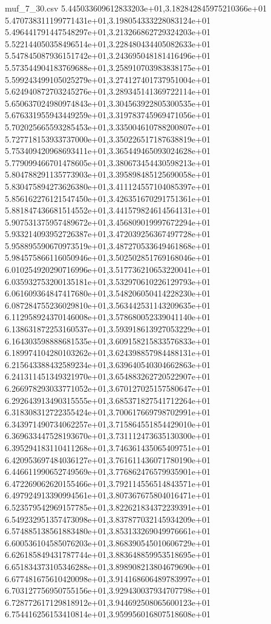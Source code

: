 \begin{filecontents*}{muf_7_30.csv}
5.445033609612833203e+01,3.182842845975210366e+01
5.470738311199771431e+01,3.198054333228083124e+01
5.496441791447548297e+01,3.213266862729324203e+01
5.522144050358496514e+01,3.228480434405082633e+01
5.547845087936151742e+01,3.243695048181416496e+01
5.573544904183769688e+01,3.258910703983838175e+01
5.599243499105025279e+01,3.274127401737951004e+01
5.624940872703245276e+01,3.289345141369722114e+01
5.650637024980974843e+01,3.304563922805300535e+01
5.676331955943449259e+01,3.319783745969471056e+01
5.702025665593285453e+01,3.335004610788200807e+01
5.727718153933737000e+01,3.350226517187638819e+01
5.753409420968693411e+01,3.365449465093024628e+01
5.779099466701478605e+01,3.380673454430598213e+01
5.804788291135773903e+01,3.395898485125690058e+01
5.830475894273626380e+01,3.411124557104085397e+01
5.856162276121547450e+01,3.426351670291751361e+01
5.881847436681514552e+01,3.441579824614564131e+01
5.907531375957489672e+01,3.456809019997672294e+01
5.933214093952726387e+01,3.472039256367497728e+01
5.958895590670973519e+01,3.487270533649461868e+01
5.984575866116050946e+01,3.502502851769168046e+01
6.010254920290716996e+01,3.517736210653220041e+01
6.035932753200135181e+01,3.532970610226129793e+01
6.061609364847417680e+01,3.548206050414228230e+01
6.087284755236029810e+01,3.563442531143209635e+01
6.112958924370146008e+01,3.578680052339041140e+01
6.138631872253160537e+01,3.593918613927053229e+01
6.164303598888681535e+01,3.609158215833576833e+01
6.189974104280103262e+01,3.624398857984488131e+01
6.215643388432589234e+01,3.639640540304662863e+01
6.241311451349321970e+01,3.654883262720522907e+01
6.266978293033771052e+01,3.670127025157580647e+01
6.292643913490315555e+01,3.685371827541712264e+01
6.318308312722355424e+01,3.700617669798702991e+01
6.343971490734062257e+01,3.715864551854429010e+01
6.369633447528193670e+01,3.731112473635130300e+01
6.395294183110411268e+01,3.746361435065409751e+01
6.420953697484036127e+01,3.761611436071780190e+01
6.446611990652749569e+01,3.776862476579935901e+01
6.472269062620155466e+01,3.792114556514843571e+01
6.497924913390994561e+01,3.807367675804016471e+01
6.523579542969157785e+01,3.822621834372239391e+01
6.549232951357473098e+01,3.837877032145934209e+01
6.574885138561883480e+01,3.853133269049976661e+01
6.600536104585076203e+01,3.868390545010606729e+01
6.626185849431787744e+01,3.883648859953518695e+01
6.651834373105346288e+01,3.898908213804679690e+01
6.677481675610420098e+01,3.914168606489783997e+01
6.703127756950755156e+01,3.929430037934707798e+01
6.728772617129818912e+01,3.944692508065600123e+01
6.754416256153410814e+01,3.959956016807518608e+01

\end{filecontents*}
